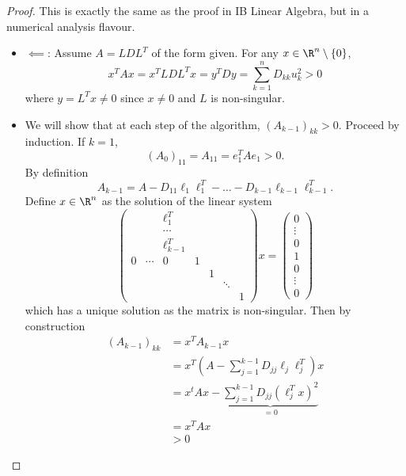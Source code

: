 \documentclass[a4paper]{article}
\begin{document}
\begin{proof}
  This is exactly the same as the proof in IB Linear Algebra, but in a numerical analysis flavour.
  \begin{itemize}
  \item \(\impliedby\): Assume \(A = LDL^T\) of the form given. For any \(x \in \R^n \setminus \{0\}\),
    \[
      x^TAx = x^TLDL^Tx = y^TDy = \sum_{k = 1}^n D_{kk}u_k^2 > 0
    \]
    where \(y = L^Tx \neq 0\) since \(x \neq 0\) and \(L\) is non-singular.
  \item We will show that at each step of the algorithm, \((A_{k - 1})_{kk} > 0\). Proceed by induction. If \(k = 1\),
    \[
      (A_0)_{11} = A_{11} = e_1^TAe_1 > 0.
    \]
    By definition
    \[
      A_{k - 1} = A - D_{11}\ell_1\ell_1^T - \dots - D_{k - 1}\ell_{k - 1}\ell_{k - 1}^T.
    \]
    Define \(x \in \R^n\) as the solution of the linear system
    \[
      \begin{pmatrix}
        & & \ell_1^T \\
        & & \cdots \\
        & & \ell_{k - 1}^T \\
        0 & \cdots & 0 & 1 \\
        & & & & 1 \\
        & & & & & \ddots \\
        & & & & & & 1
      \end{pmatrix}
      x =
      \begin{pmatrix}
        0 \\
        \vdots \\
        0 \\
        1 \\
        0 \\
        \vdots \\
        0
      \end{pmatrix}
    \]
    which has a unique solution as the matrix is non-singular. Then by construction
    \begin{align*}
      (A_{k - 1})_{kk}
      &= x^TA_{k - 1}x \\
      &= x^T(A - \sum_{j = 1}^{k - 1}D_{jj}\ell_j\ell_j^T)x \\
      &= x^tAx - \underbrace{\sum_{j = 1}^{k - 1} D_{jj} (\ell_j^Tx)^2}_{= 0} \\
      &= x^TAx \\
      & > 0
    \end{align*}
  \end{itemize}
\end{proof}
\end{document}

